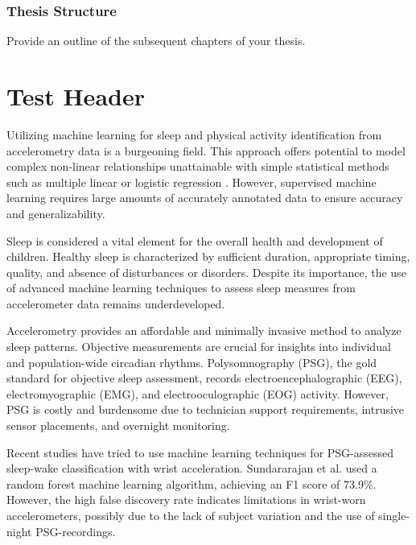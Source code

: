 \documentclass[
  10pt,
  letterpaper,
  DIV=11,
  numbers=noendperiod]{scrartcl}
\begin{document}
\hypertarget{thesis-structure}{%
\subsubsection{Thesis Structure}\label{thesis-structure}}

Provide an outline of the subsequent chapters of your thesis.

\hypertarget{test-header}{%
\section{Test Header}\label{test-header}}

Utilizing machine learning for sleep and physical activity
identification from accelerometry data is a burgeoning field. This
approach offers potential to model complex non-linear relationships
unattainable with simple statistical methods such as multiple linear or
logistic regression \autocite{fiorillo_automated_2019}. However,
supervised machine learning requires large amounts of accurately
annotated data to ensure accuracy and
generalizability\autocite{van_der_ploeg_modern_2014}.

Sleep is considered a vital element for the overall health and
development of
children\autocite{chaput_systematic_2017,chaput_systematic_2016,st-onge_sleep_2016}.
Healthy sleep is characterized by sufficient duration, appropriate
timing, quality, and absence of disturbances or
disorders\autocite{gruber_position_2014}. Despite its importance, the
use of advanced machine learning techniques to assess sleep measures
from accelerometer data remains
underdeveloped\autocite{haghayegh_application_2020}.

Accelerometry provides an affordable and minimally invasive method to
analyze sleep patterns. Objective measurements are crucial for insights
into individual and population-wide circadian rhythms. Polysomnography
(PSG), the gold standard for objective sleep assessment, records
electroencephalographic (EEG), electromyographic (EMG), and
electrooculographic (EOG) activity. However, PSG is costly and
burdensome due to technician support requirements, intrusive sensor
placements, and overnight monitoring\autocite{vaughn_technical_2008}.

Recent studies have tried to use machine learning techniques for
PSG-assessed sleep-wake classification with wrist
acceleration\autocite{haghayegh_application_2020,sundararajan_sleep_2021,hees_novel_2015}.
Sundararajan et al.\autocite{sundararajan_sleep_2021} used a random
forest machine learning algorithm, achieving an F1 score of 73.9\%.
However, the high false discovery rate indicates limitations in
wrist-worn accelerometers, possibly due to the lack of subject variation
and the use of single-night PSG-recordings.
\end{document}
